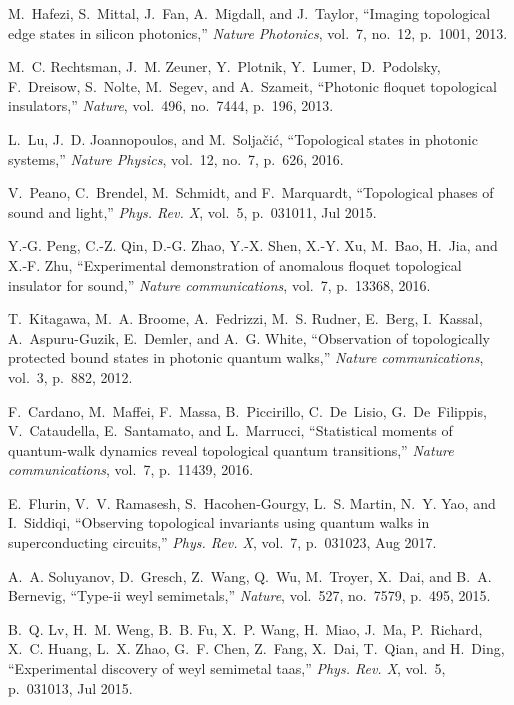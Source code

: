 \documentclass[10pt]{revtex4-1}
\begin{document}
\begin{thebibliography}{10}
M.~Hafezi, S.~Mittal, J.~Fan, A.~Migdall, and J.~Taylor, ``Imaging topological
  edge states in silicon photonics,'' {\em Nature Photonics}, vol.~7, no.~12,
  p.~1001, 2013.

M.~C. Rechtsman, J.~M. Zeuner, Y.~Plotnik, Y.~Lumer, D.~Podolsky, F.~Dreisow,
  S.~Nolte, M.~Segev, and A.~Szameit, ``Photonic floquet topological
  insulators,'' {\em Nature}, vol.~496, no.~7444, p.~196, 2013.

L.~Lu, J.~D. Joannopoulos, and M.~Solja{\v{c}}i{\'c}, ``Topological states in
  photonic systems,'' {\em Nature Physics}, vol.~12, no.~7, p.~626, 2016.

V.~Peano, C.~Brendel, M.~Schmidt, and F.~Marquardt, ``Topological phases of
  sound and light,'' {\em Phys. Rev. X}, vol.~5, p.~031011, Jul 2015.

Y.-G. Peng, C.-Z. Qin, D.-G. Zhao, Y.-X. Shen, X.-Y. Xu, M.~Bao, H.~Jia, and
  X.-F. Zhu, ``Experimental demonstration of anomalous floquet topological
  insulator for sound,'' {\em Nature communications}, vol.~7, p.~13368, 2016.

T.~Kitagawa, M.~A. Broome, A.~Fedrizzi, M.~S. Rudner, E.~Berg, I.~Kassal,
  A.~Aspuru-Guzik, E.~Demler, and A.~G. White, ``Observation of topologically
  protected bound states in photonic quantum walks,'' {\em Nature
  communications}, vol.~3, p.~882, 2012.

F.~Cardano, M.~Maffei, F.~Massa, B.~Piccirillo, C.~De~Lisio, G.~De~Filippis,
  V.~Cataudella, E.~Santamato, and L.~Marrucci, ``Statistical moments of
  quantum-walk dynamics reveal topological quantum transitions,'' {\em Nature
  communications}, vol.~7, p.~11439, 2016.

E.~Flurin, V.~V. Ramasesh, S.~Hacohen-Gourgy, L.~S. Martin, N.~Y. Yao, and
  I.~Siddiqi, ``Observing topological invariants using quantum walks in
  superconducting circuits,'' {\em Phys. Rev. X}, vol.~7, p.~031023, Aug 2017.

A.~A. Soluyanov, D.~Gresch, Z.~Wang, Q.~Wu, M.~Troyer, X.~Dai, and B.~A.
  Bernevig, ``Type-ii weyl semimetals,'' {\em Nature}, vol.~527, no.~7579,
  p.~495, 2015.

B.~Q. Lv, H.~M. Weng, B.~B. Fu, X.~P. Wang, H.~Miao, J.~Ma, P.~Richard, X.~C.
  Huang, L.~X. Zhao, G.~F. Chen, Z.~Fang, X.~Dai, T.~Qian, and H.~Ding,
  ``Experimental discovery of weyl semimetal taas,'' {\em Phys. Rev. X},
  vol.~5, p.~031013, Jul 2015.


\end{thebibliography}
\end{document}
